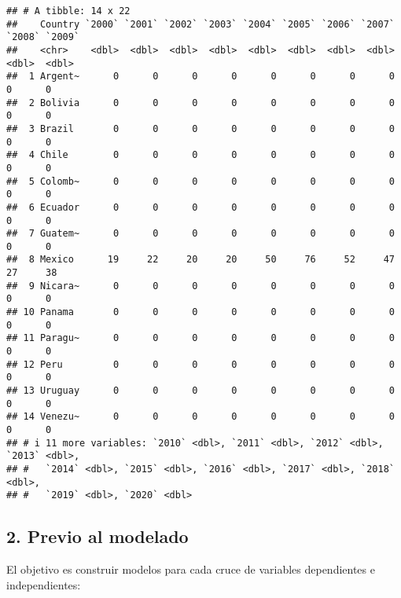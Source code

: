 \documentclass[
  11pt,
]{article}
\begin{document}
\begin{verbatim}
## # A tibble: 14 x 22
##    Country `2000` `2001` `2002` `2003` `2004` `2005` `2006` `2007` `2008` `2009`
##    <chr>    <dbl>  <dbl>  <dbl>  <dbl>  <dbl>  <dbl>  <dbl>  <dbl>  <dbl>  <dbl>
##  1 Argent~      0      0      0      0      0      0      0      0      0      0
##  2 Bolivia      0      0      0      0      0      0      0      0      0      0
##  3 Brazil       0      0      0      0      0      0      0      0      0      0
##  4 Chile        0      0      0      0      0      0      0      0      0      0
##  5 Colomb~      0      0      0      0      0      0      0      0      0      0
##  6 Ecuador      0      0      0      0      0      0      0      0      0      0
##  7 Guatem~      0      0      0      0      0      0      0      0      0      0
##  8 Mexico      19     22     20     20     50     76     52     47     27     38
##  9 Nicara~      0      0      0      0      0      0      0      0      0      0
## 10 Panama       0      0      0      0      0      0      0      0      0      0
## 11 Paragu~      0      0      0      0      0      0      0      0      0      0
## 12 Peru         0      0      0      0      0      0      0      0      0      0
## 13 Uruguay      0      0      0      0      0      0      0      0      0      0
## 14 Venezu~      0      0      0      0      0      0      0      0      0      0
## # i 11 more variables: `2010` <dbl>, `2011` <dbl>, `2012` <dbl>, `2013` <dbl>,
## #   `2014` <dbl>, `2015` <dbl>, `2016` <dbl>, `2017` <dbl>, `2018` <dbl>,
## #   `2019` <dbl>, `2020` <dbl>
\end{verbatim}

\subsection{2. Previo al modelado}\label{previo-al-modelado}

El objetivo es construir modelos para cada cruce de variables
dependientes e independientes:
\end{document}

